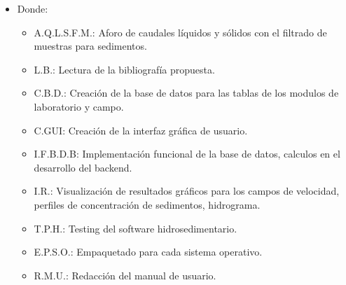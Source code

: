 \documentclass[12pt,a4paper]{report}
\begin{document}
\begin{landscape}
\begin{itemize}
\item Donde:
	\begin{itemize}
	\item A.Q.L.S.F.M.: Aforo de caudales líquidos y sólidos con el filtrado de muestras para sedimentos.
	\item L.B.: Lectura de la bibliografía propuesta.
	\item C.B.D.: Creación de la base de datos para las tablas de los modulos de laboratorio y campo.
	\item C.GUI: Creación de la interfaz gráfica de usuario.
	\item I.F.B.D.B: Implementación funcional de la base de datos, calculos en el desarrollo del backend.
	\item I.R.: Visualización de resultados gráficos para los campos de velocidad, perfiles de concentración de sedimentos, hidrograma.
	\item T.P.H.: Testing del software hidrosedimentario.
	\item E.P.S.O.: Empaquetado para cada sistema operativo.
	\item R.M.U.: Redacción del manual de usuario.
	\end{itemize}
\end{itemize}


\end{landscape} 
\end{document}
